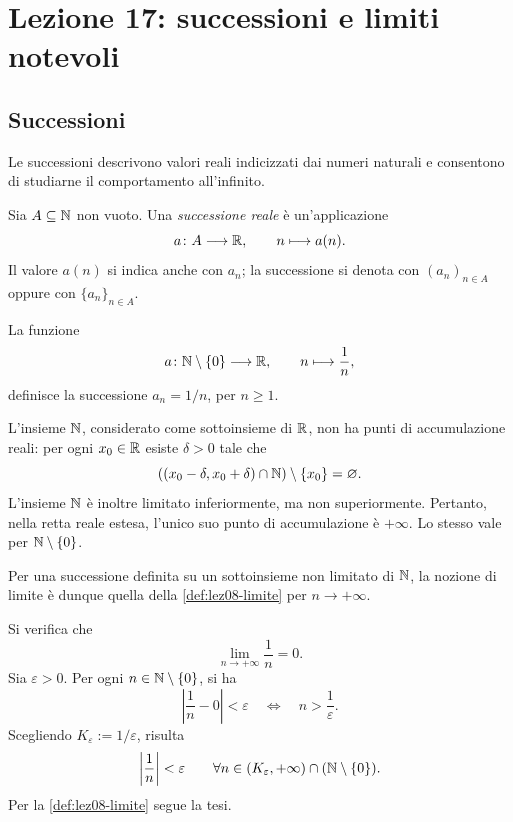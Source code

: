 \chapter[Lezione 17 --- 30 ottobre 2026]{Lezione 17: successioni e limiti notevoli}
\label{chap:lezione-17}

\section{Successioni}
\label{sec:lez17-successioni}

Le successioni descrivono valori reali indicizzati dai numeri
naturali e consentono di studiarne il comportamento all'infinito.

\begin{definition}
\label{def:lez17-successione}
Sia \(A\subseteq\mathbb{N}\) non vuoto. Una \emph{successione reale}
è un'applicazione
\[
  a\colon A\longrightarrow\mathbb{R},
  \qquad n\longmapsto a(n).
\]
Il valore \(a(n)\) si indica anche con \(a_n\); la successione
si denota con \((a_n)_{n\in A}\) oppure con
\(\{a_n\}_{n\in A}\).
\end{definition}

\begin{example}
\label{ex:lez17-successione-reciproci}
La funzione
\[
  a\colon\mathbb{N}\setminus\{0\}\longrightarrow\mathbb{R},
  \qquad n\longmapsto\frac1n,
\]
definisce la successione \(a_n=1/n\), per \(n\ge1\).
\end{example}

L'insieme \(\mathbb{N}\), considerato come sottoinsieme di \(\mathbb{R}\),
non ha punti di accumulazione reali: per ogni \(x_0\in\mathbb{R}\)
esiste \(\delta>0\) tale che
\[
  ((x_0-\delta,x_0+\delta)\cap\mathbb{N})\setminus\{x_0\}
  =\varnothing.
\]
L'insieme \(\mathbb{N}\) è inoltre limitato inferiormente, ma non
superiormente. Pertanto, nella retta reale estesa,
l'unico suo punto di accumulazione è \(+\infty\).
Lo stesso vale per \(\mathbb{N}\setminus\{0\}\).

Per una successione definita su un sottoinsieme non limitato
di \(\mathbb{N}\), la nozione di limite è dunque quella della
\cref{def:lez08-limite} per \(n\to+\infty\).

\begin{example}
\label{ex:lez17-limite-reciproci}
Si verifica che
\[
  \lim_{n\to+\infty}\frac1n=0.
\]
Sia \(\varepsilon>0\). Per ogni
\(n\in\mathbb{N}\setminus\{0\}\), si ha
\[
  \left|\frac1n-0\right|<\varepsilon
  \quad\Longleftrightarrow\quad
  n>\frac1\varepsilon.
\]
Scegliendo \(K_\varepsilon:=1/\varepsilon\), risulta
\[
  \left|\frac1n\right|<\varepsilon
  \qquad\forall n\in(K_\varepsilon,+\infty)
  \cap(\mathbb{N}\setminus\{0\}).
\]
Per la \cref{def:lez08-limite} segue la tesi.
\end{example}

